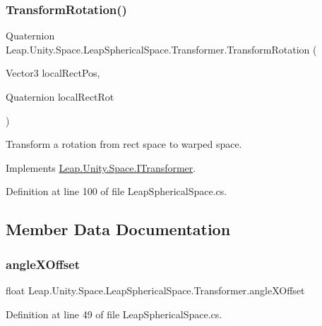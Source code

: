 \subsubsection{\texorpdfstring{TransformRotation()}{TransformRotation()}}
{\footnotesize\ttfamily Quaternion Leap.\+Unity.\+Space.\+Leap\+Spherical\+Space.\+Transformer.\+Transform\+Rotation (\begin{DoxyParamCaption}\item[{Vector3}]{local\+Rect\+Pos,  }\item[{Quaternion}]{local\+Rect\+Rot }\end{DoxyParamCaption})}



Transform a rotation from rect space to warped space. 



Implements \mbox{\hyperlink{interface_leap_1_1_unity_1_1_space_1_1_i_transformer_a69931f79b1e951cf38f1b3855e02ba91}{Leap.\+Unity.\+Space.\+I\+Transformer}}.



Definition at line 100 of file Leap\+Spherical\+Space.\+cs.



\subsection{Member Data Documentation}
\mbox{\label{class_leap_1_1_unity_1_1_space_1_1_leap_spherical_space_1_1_transformer_a684fd7c7ecc889797e438534a4efc7b7}} 
\subsubsection{\texorpdfstring{angleXOffset}{angleXOffset}}
{\footnotesize\ttfamily float Leap.\+Unity.\+Space.\+Leap\+Spherical\+Space.\+Transformer.\+angle\+X\+Offset}



Definition at line 49 of file Leap\+Spherical\+Space.\+cs.

\mbox{\label{class_leap_1_1_unity_1_1_space_1_1_leap_spherical_space_1_1_transformer_ae9953d013faee31cc40c76d377620479}} 
